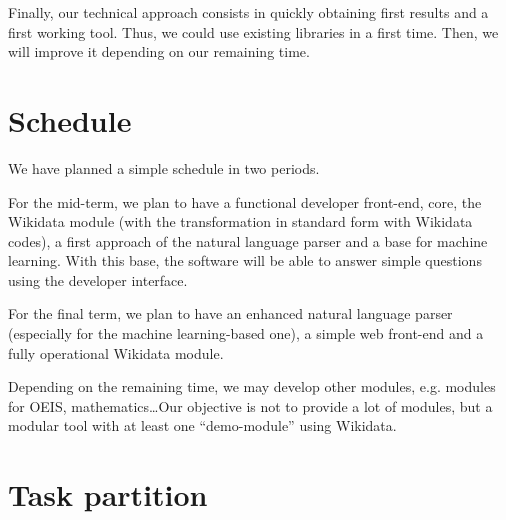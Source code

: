 \documentclass[a4paper,10pt]{article}
\begin{document}
Finally, our technical approach consists in quickly obtaining first results and 
a first working tool. Thus, we could use existing libraries in a first time. Then, 
we will improve it depending on our remaining time.

\section{Schedule}

We have planned a simple schedule in two periods.

For the mid-term, we plan to have a functional developer front-end, core, the 
Wikidata module (with the transformation in standard form with Wikidata codes), 
a first approach of the natural language parser and a base for machine learning. 
With this base, the software will be able to answer simple questions using the 
developer interface.

For the final term, we plan to have an enhanced natural language parser (especially 
for the machine learning-based one), a simple web front-end and a fully operational 
Wikidata module.

Depending on the remaining time, we may develop other modules, e.g. modules for 
OEIS, mathematics\ldots Our objective is not to provide a lot of modules, but a 
modular tool with at least one ``demo-module'' using Wikidata.

\section{Task partition}
\end{document}
